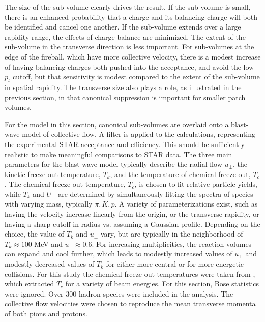 The size of the sub-volume clearly drives the result. If the sub-volume is small, there is an enhanced probability that a charge and its balancing charge will both be identified and cancel one another. If the sub-volume extends over a large rapidity range, the effects of charge balance are minimized. The extent of the sub-volume in the transverse direction is less important. For sub-volumes at the edge of the fireball, which have more collective velocity, there is a modest increase of having balancing charges both pushed into the acceptance, and avoid the low $p_t$ cutoff, but that sensitivity is modest compared to the extent of the sub-volume in spatial rapidity. The transverse size also plays a role, as illustrated in the previous section, in that canonical suppression is important for smaller patch volumes. 

For the model in this section, canonical sub-volumes are overlaid onto a blast-wave model of collective flow. A filter is applied to the calculations, representing the experimental STAR acceptance and efficiency. This should be sufficiently realistic to make meaningful comparisons to STAR data. The three main parameters for the blast-wave model typically describe the radial flow $u_\perp$, the kinetic freeze-out temperature, $T_k$, and the temperature of chemical freeze-out, $T_c$. The chemical freeze-out temperature, $T_c$, is chosen to fit relative particle yields, while $T_k$ and $U_\perp$ are determined by simultaneously fitting the spectra of species with varying mass, typically $\pi,K,p$. A variety of parameterizations exist, such as having the velocity increase linearly from the origin, or the transverse rapidity, or having a sharp cutoff in radius vs. assuming a Gaussian profile. Depending on the choice, the value of $T_k$ and $u_\perp$ vary, but are typically in the neighborhood of $T_k\approx 100$ MeV and $u_\perp\approx 0.6$. For increasing multiplicities, the reaction volumes can expand and cool further, which leads to modestly increased values of $u_\perp$ and modestly decreased values of $T_k$ for either more central or for more energetic collisions. For this study the chemical freeze-out temperatures were taken from \cite{Das:2012yq,Kumar:2012np}, which extracted $T_c$ for a variety of beam energies. For this section, Bose statistics were ignored. Over 300 hadron species were included in the analysis. The collective flow velocities were chosen to reproduce the mean transverse momenta of both pions and protons.

